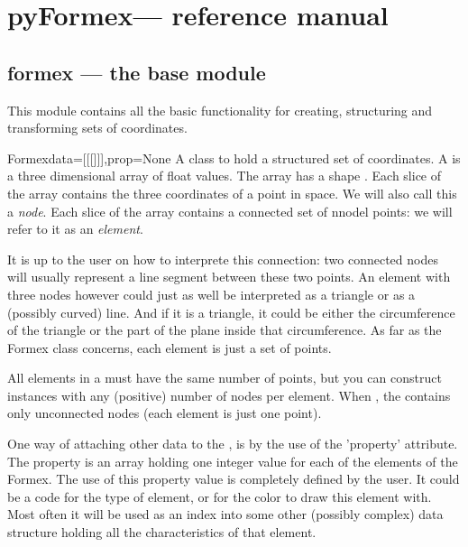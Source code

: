 \documentclass[a4paper]{manual}
\newcommand{\pyformex}{pyFormex\xspace}
\begin{document}
{%
\chapter{\pyformex --- reference manual}
{\label{cha:reference}

\section{formex --- the base module}
{\label{sec:formex}

This module contains all the basic functionality for creating, structuring and transforming sets of coordinates.

\begin{classdesc}  {Formex}{data=[[[]]],prop=None}
A class to hold a structured set of coordinates. A  is a three dimensional array of float values. The array has a shape . Each slice \code{[i,j]} of the array contains the three coordinates of a point in space. We will also call this a \emph{node}. Each slice \code{[i]} of the array contains a connected set of nnodel points: we will refer to it as an \emph{element}. 

It is up to the user on how to interprete this connection: two connected nodes will usually represent a line segment between these two points. An element with three nodes however could just as well be interpreted as a triangle or as a (possibly curved) line. And if it is a triangle, it could be either the circumference of the triangle or the part of the plane inside that circumference. As far as the Formex class concerns, each element is just a set of points. 

All elements in a  must have the same number of points, but you can construct  instances with any (positive) number of nodes per element. When , the  contains only unconnected nodes (each element is just one point).

One way of attaching other data to the , is by the use of the 'property' attribute. The property is an array holding one integer value for each of the elements of the Formex. The use of this property value is completely defined by the user. It could be a code for the type of element, or for the color to draw this element with. Most often it will be used as an index into some other (possibly complex) data structure holding all the characteristics of that element. 


\end{classdesc}}}}
\end{document}
